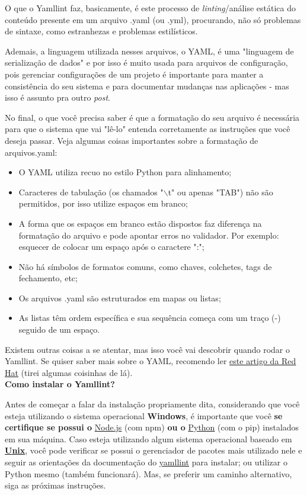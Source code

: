 O que o \gls{Yamllint} faz, basicamente, é este processo de \textit{linting}/análise estática do conteúdo presente em um arquivo .yaml (ou .yml), procurando, não só problemas de sintaxe, como estranhezas e problemas estilísticos. 

Ademais, a linguagem utilizada nesses arquivos, o YAML, é uma "linguagem de serialização de dados" e por isso é muito usada para arquivos de configuração, pois gerenciar configurações de um projeto é importante para manter a consistência do seu sistema e para documentar mudanças nas aplicações - mas isso é assunto pra outro \textit{post}.

No final, o que você precisa saber é que a formatação do seu arquivo é necessária para que o sistema que vai "lê-lo" entenda corretamente as instruções que você deseja passar. Veja algumas coisas importantes sobre a formatação de arquivos.yaml:

\begin{itemize}
    \item O YAML utiliza recuo no estilo \gls{Python} para alinhamento;
    \item Caracteres de tabulação (os chamados "$\backslash$t" ou apenas "TAB")  não são permitidos, por isso utilize espaços em branco;
    \item A forma que os espaços em branco estão dispostos faz diferença na formatação do arquivo e pode apontar erros no validador. Por exemplo: esquecer de colocar um espaço após o caractere ":";
    \item Não há símbolos de formatos comuns, como chaves, colchetes, tags de fechamento, etc;
    \item Os arquivos .yaml são estruturados em mapas ou listas;
    \item As listas têm ordem específica e sua sequência começa com um traço (-) seguido de um espaço.
\end{itemize}

Existem outras coisas a se atentar, mas isso você vai descobrir quando rodar o \gls{Yamllint}. Se quiser saber mais sobre o YAML, recomendo ler \href{https://www.redhat.com/pt-br/topics/automation/what-is-yaml}{este artigo da Red Hat} (tirei algumas coisinhas de lá).\\

\textbf{Como instalar o Yamllint?}

Antes de começar a falar da instalação propriamente dita, considerando que você esteja utilizando o sistema operacional \textbf{Windows}, é importante que você \textbf{se certifique se possui o} \href{https://nodejs.org/en/}{Node.js} (com npm) \textbf{ou o} \href{https://python.org.br/instalacao-windows/}{Python} (com o pip) instalados em sua máquina. Caso esteja utilizando algum sistema operacional baseado em \textbf{\href{https://www.tecmundo.com.br/macos/10556-unix-o-pai-de-todos-os-sistemas-operacionais.htm}{Unix}}, você pode verificar se possui o gerenciador de pacotes mais utilizado nele e seguir as orientações da documentação do \href{https://yamllint.readthedocs.io/en/stable/quickstart.html}{yamllint} para instalar; ou utilizar o \gls{Python} mesmo (também funcionará). Mas, se preferir um caminho alternativo, siga as próximas instruções.\\


